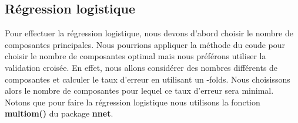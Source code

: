 \documentclass[12pt,a4paper]{article}
\begin{document}
\subsection{Régression logistique} 
Pour effectuer la régression logistique, nous devons d'abord choisir le nombre
de composantes principales. Nous pourrions appliquer la méthode du \og coude
\fg  pour choisir le nombre de composantes optimal mais nous préférons utiliser
la validation croisée. En effet, nous allons considérer des nombres différents
de composantes et calculer le taux d'erreur en utilisant un -folds\fg.
Nous choisissons alors le nombre de composantes pour lequel ce taux d'erreur
sera minimal.\\
Notons que pour faire la régression logistique nous utilisons la fonction
\textbf{multiom()} du package \textbf{nnet}.\vspace{2mm}
\end{document}
